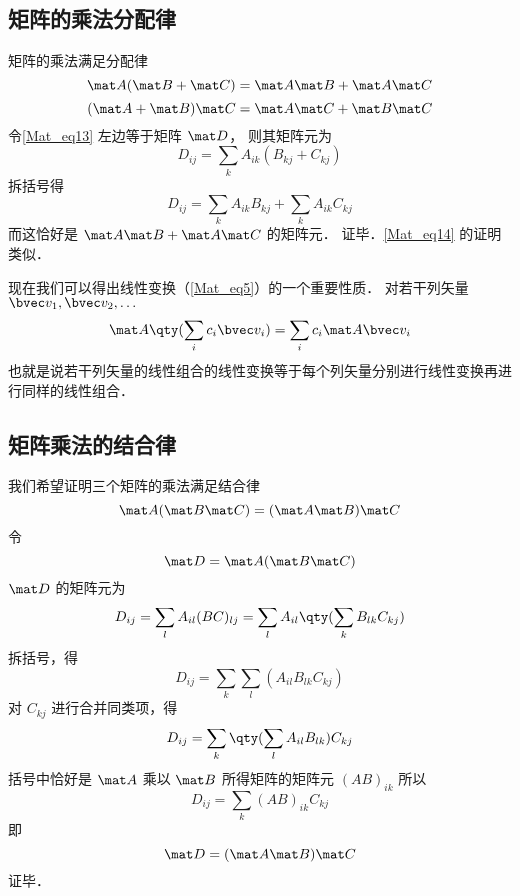 \subsection{矩阵的乘法分配律}
矩阵的乘法满足分配律
\begin{equation}\label{Mat_eq13}
\mat A (\mat B + \mat C) = \mat A \mat B + \mat A \mat C
\end{equation}
\begin{equation}\label{Mat_eq14}
(\mat A + \mat B) \mat C = \mat A \mat C + \mat B \mat C
\end{equation}
令\autoref{Mat_eq13} 左边等于矩阵 $\mat D$， 则其矩阵元为
\begin{equation}
D_{ij} = \sum_k A_{ik} (B_{kj} + C_{kj})
\end{equation}
拆括号得
\begin{equation}
D_{ij} = \sum_k A_{ik}B_{kj} + \sum_k A_{ik}C_{kj}
\end{equation}
而这恰好是 $\mat A \mat B + \mat A \mat C$ 的矩阵元． 证毕．\autoref{Mat_eq14} 的证明类似．

现在我们可以得出线性变换（\autoref{Mat_eq5}）的一个重要性质． 对若干列矢量 $\bvec v_1, \bvec v_2, \dots$
\begin{equation}\label{Mat_eq17}
\mat A \qty(\sum_i c_i \bvec v_i) = \sum_i c_i \mat A \bvec v_i
\end{equation}
也就是说若干列矢量的线性组合的线性变换等于每个列矢量分别进行线性变换再进行同样的线性组合．

\subsection{矩阵乘法的结合律}
我们希望证明三个矩阵的乘法满足结合律
\begin{equation}\label{Mat_eq1}
\mat A (\mat B\mat C) = (\mat A \mat B) \mat C
\end{equation}
令
\begin{equation}
\mat D = \mat A (\mat B\mat C)
\end{equation}
$\mat D$ 的矩阵元为
\begin{equation}
D_{ij} = \sum_l A_{il} (BC)_{lj} = \sum_l A_{il} \qty(\sum_k B_{lk} C_{kj} )
\end{equation}
拆括号，得
\begin{equation}
D_{ij} = \sum_k\sum_l  ( A_{il} B_{lk} C_{kj} )
\end{equation}
对 $C_{kj}$ 进行合并同类项，得
\begin{equation}
D_{ij} = \sum_k \qty(\sum_l A_{il} B_{lk} ) C_{kj} 
\end{equation}
括号中恰好是 $\mat A$ 乘以 $\mat B$ 所得矩阵的矩阵元 $(AB)_{ik}$ 所以
\begin{equation}
D_{ij} = \sum_k (AB)_{ik} C_{kj}
\end{equation}
即
\begin{equation}
\mat D = (\mat A\mat B)\mat C
\end{equation}
证毕．

